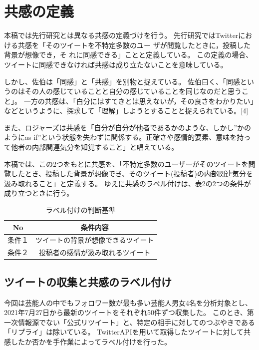 \documentclass[dvipdfmx]{issj}
\begin{document}
\section{共感の定義}  %
本稿では先行研究とは異なる共感の定義づけを行う。
先行研究ではTwitterにおける共感を「そのツイートを不特定多数のユー ザが閲覧したときに，投稿した背景が想像でき，そ れに同感できる」ことと定義している。
この定義の場合、ツイートに同感できなければ共感は成り立たないことを意味している。


しかし、佐伯は「同感」と「共感」を別物と捉えている。
佐伯曰く、「同感というのはその人の感じていることと自分の感じていることを同じなのだと思うこと」。
一方の共感は、「白分にはすてきとは思えないが，その良さをわかりたい」などというように、探求して「理解」しようとすることと捉えられている。[4]


また、ロジャーズは共感を「自分が自分が他者であるかのような、しかし”かのようにas if”という状態を失わずに関係する。正確さや感情的要素、意味を持って他者の内部関連気分を知覚すること」と唱えている。


本稿では、この2つをもとに共感を、「不特定多数のユーザーがそのツイートを閲覧したとき、投稿した背景が想像でき、そのツイート(投稿者)の内部関連気分を汲み取れること」と定義する。
ゆえに共感のラベル付けは、表2の2つの条件が成り立つときに行う。

\begin{table}[t]\centering
\caption{ラベル付けの判断基準}\label{tbl:font}
\begin{small}
\begin{tabular}{|c|c|} \hline
No   & 条件内容\\\hline\hline
条件１& ツイートの背景が想像できるツイート\\\hline
条件２ & 投稿者の感情が汲み取れるツイート\\\hline
\end{tabular}
\end{small}
\end{table}


\subsection{ツイートの収集と共感のラベル付け }  %
今回は芸能人の中でもフォロワー数が最も多い芸能人男女4名を分析対象とし、2021年7月27日から最新のツイートをそれぞれ50件ずつ収集した。
このとき、第一次情報源でない「公式リツイート」と、特定の相手に対してのつぶやきである「リプライ」は除いている。
TwitterAPIを用いて取得したツイートに対して共感したか否かを手作業によってラベル付けを行った。
\end{document}
